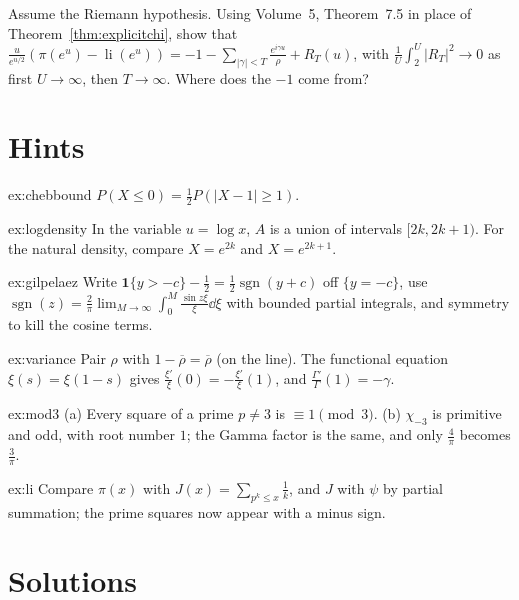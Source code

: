 \begin{exercise}[$\star\star$]\label{ex:li}
Assume the Riemann hypothesis. Using Volume~5, Theorem~7.5 in place of Theorem~\ref{thm:explicitchi}, show that $\frac u{e^{u/2}}(\pi(e^u)-\operatorname{li}(e^u))=-1-\sum_{|\gamma|<T}\frac{e^{i\gamma u}}\rho+R_T(u)$, with $\frac1U\int_2^U|R_T|^2\to0$ as first $U\to\infty$, then $T\to\infty$. Where does the $-1$ come from?
\end{exercise}

\section{Hints}

\begin{hint}{ex:chebbound}
$P(X\le0)=\frac12P(|X-1|\ge1)$.
\end{hint}
\begin{hint}{ex:logdensity}
In the variable $u=\log x$, $A$ is a union of intervals $[2k,2k+1)$. For the natural density, compare $X=e^{2k}$ and $X=e^{2k+1}$.
\end{hint}
\begin{hint}{ex:gilpelaez}
Write $\mathbf 1\{y>-c\}-\frac12=\frac12\operatorname{sgn}(y+c)$ off $\{y=-c\}$, use $\operatorname{sgn}(z)=\frac2\pi\lim_{M\to\infty}\int_0^M\frac{\sin z\xi}\xi\dd\xi$ with bounded partial integrals, and symmetry to kill the cosine terms.
\end{hint}
\begin{hint}{ex:variance}
Pair $\rho$ with $1-\overline\rho=\overline\rho$ (on the line). The functional equation $\xi(s)=\xi(1-s)$ gives $\frac{\xi'}\xi(0)=-\frac{\xi'}\xi(1)$, and $\frac{\Gamma'}\Gamma(1)=-\gamma$.
\end{hint}
\begin{hint}{ex:mod3}
(a) Every square of a prime $p\ne3$ is $\equiv1\pmod3$. (b) $\chi_{-3}$ is primitive and odd, with root number $1$; the Gamma factor is the same, and only $\frac4\pi$ becomes $\frac3\pi$.
\end{hint}
\begin{hint}{ex:li}
Compare $\pi(x)$ with $J(x)=\sum_{p^k\le x}\frac1k$, and $J$ with $\psi$ by partial summation; the prime squares now appear with a minus sign.
\end{hint}

\section{Solutions}

